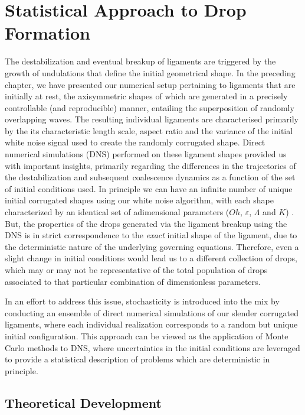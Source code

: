 \setchapterpreamble[u]{\margintoc}
\chapter{Statistical Approach to Drop Formation}

%


The destabilization and eventual breakup of ligaments are triggered 
by the growth of undulations that define the initial geometrical shape. 
In the preceding chapter, we have presented our numerical setup pertaining to 
ligaments that are initially at rest, the axisymmetric shapes of which 
are generated in a precisely controllable (and reproducible) manner, 
entailing the superposition of randomly overlapping waves. 
The resulting individual ligaments are characterised primarily 
by the its characteristic length scale, aspect ratio and the variance of 
the initial white noise signal used to create the randomly corrugated shape.
Direct numerical simulations (DNS) performed on these ligament shapes 
provided us with important insights, primarily regarding the differences in the 
trajectories of the destabilization and subsequent coalescence dynamics
as a function of the set of initial conditions used. 
In principle we can have an infinite number of unique initial corrugated shapes 
using our white noise algorithm, with each shape characterized by an identical set 
of adimensional parameters ($Oh$, $\varepsilon$, $\Lambda$ and $K$) .
But, the properties of the drops generated via the ligament breakup 
using the DNS is in strict correspondence to the \textit{exact} initial shape 
of the ligament, due to the deterministic nature of the underlying governing equations. 
Therefore, even a slight change in initial conditions would lead us to a different collection 
of drops, which may or may not be representative of the total population of drops associated to 
that particular combination of dimensionless parameters. 

In an effort to address this issue, stochasticity is introduced into
the mix by conducting an ensemble of direct numerical simulations of our 
slender corrugated ligaments, where each individual realization corresponds
to a random but unique initial configuration. 
This approach can be viewed as the application of Monte Carlo methods to DNS, 
where uncertainties in the initial conditions are leveraged to provide a statistical 
description of problems which are deterministic in principle. 

\section{Theoretical Development}

